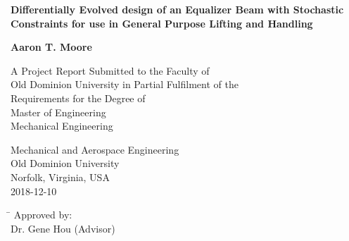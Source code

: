 \begin{titlepage}
   \begin{center}
       \vspace*{1cm}
       
       \Large
       \textbf{Differentially Evolved design of an Equalizer Beam with Stochastic Constraints for use in General Purpose Lifting and Handling}
       \normalsize

       \vspace{2.5cm}
 
       \textbf{Aaron T. Moore}
 
       \vfill
 
       A Project Report Submitted to the Faculty of\\
       Old Dominion University in Partial Fulfilment of the\\
       Requirements for the Degree of\\
       \vspace{1.0cm}
       Master of Engineering\\
       Mechanical Engineering\\

 
       \vspace{0.8cm}
 
 
       Mechanical  and Aerospace Engineering\\
       Old Dominion University\\
       Norfolk, Virginia, USA\\
       2018-12-10
 
   \end{center}
   \vspace{1cm}
   \begin{tabbing}
      \hspace*{8cm}\= \kill
      \>Approved by:\\
      \>Dr. Gene Hou (Advisor)
   \end{tabbing}
\end{titlepage}